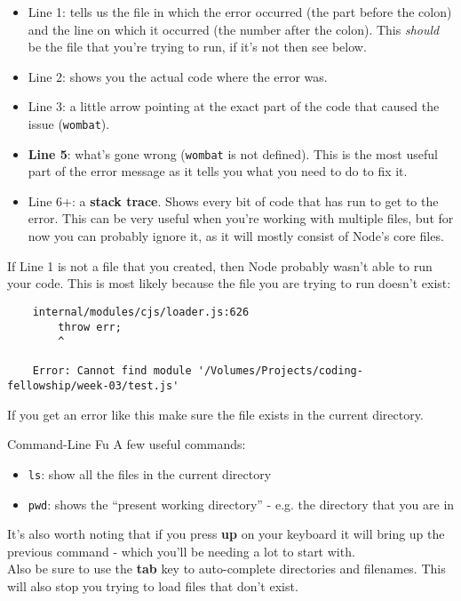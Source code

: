 \begin{itemize}
    \item Line 1: tells us the file in which the error occurred (the part before the colon) and the line on which it occurred (the number after the colon). This \textit{should} be the file that you're trying to run, if it's not then see below.
    \item Line 2: shows you the actual code where the error was.
    \item Line 3: a little arrow pointing at the exact part of the code that caused the issue (\texttt{wombat}).
    \item \textbf{Line 5}: what's gone wrong (\texttt{wombat} is not defined). This is the most useful part of the error message as it tells you what you need to do to fix it.
    \item Line 6+: a \textbf{stack trace}. Shows every bit of code that has run to get to the error. This can be very useful when you're working with multiple files, but for now you can probably ignore it, as it will mostly consist of Node's core files.
\end{itemize}

\pagebreak

If Line 1 is not a file that you created, then Node probably wasn't able to run your code. This is most likely because the file you are trying to run doesn't exist:

\begin{verbatim}
    internal/modules/cjs/loader.js:626
        throw err;
        ^

    Error: Cannot find module '/Volumes/Projects/coding-fellowship/week-03/test.js'
\end{verbatim}

If you get an error like this make sure the file exists in the current directory.

\begin{infobox}{Command-Line Fu}
    A few useful commands:

    \begin{itemize}
        \item \texttt{ls}: show all the files in the current directory
        \item \texttt{pwd}: shows the ``present working directory'' - e.g. the directory that you are in
    \end{itemize}

    It's also worth noting that if you press \textbf{up} on your keyboard it will bring up the previous command - which you'll be needing a lot to start with.
    \\

    Also be sure to use the \textbf{tab} key to auto-complete directories and filenames. This will also stop you trying to load files that don't exist.
\end{infobox}



